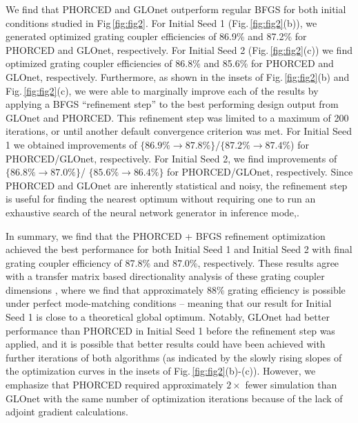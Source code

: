 \documentclass{article}
\begin{document}
We find that PHORCED and GLOnet outperform regular BFGS for both initial conditions studied in Fig\,\ref{fig:fig2}. For Initial Seed 1 (Fig.\,\ref{fig:fig2}(b)), we generated optimized grating coupler efficiencies of 86.9\% and 87.2\% for PHORCED and GLOnet, respectively. For Initial Seed 2 (Fig.\,\ref{fig:fig2}(c)) we find optimized grating coupler efficiencies of 86.8\% and 85.6\% for PHORCED and GLOnet, respectively. Furthermore, as shown in the insets of Fig.\,\ref{fig:fig2}(b) and Fig.\,\ref{fig:fig2}(c), we were able to marginally improve each of the results by applying a BFGS ``refinement step'' to the best performing design output from GLOnet and PHORCED. This refinement step was limited to a maximum of 200 iterations, or until another default convergence criterion was met. For Initial Seed 1 we obtained improvements of $\{86.9\%\rightarrow87.8\%\}$/$\{87.2\%\rightarrow 87.4\%$) for PHORCED/GLOnet, respectively. For Initial Seed 2, we find improvements of {$\{86.8\%\rightarrow87.0\%\}$/ $\{85.6\%\rightarrow 86.4\%\}$} for PHORCED/GLOnet, respectively. Since PHORCED and GLOnet are inherently statistical and noisy, the refinement step is useful for finding the nearest optimum without requiring one to run an exhaustive search of the neural network generator in inference mode,.

In summary, we find that the PHORCED + BFGS refinement optimization achieved the best performance for both Initial Seed 1 and Initial Seed 2 with final grating coupler efficiency of 87.8\% and 87.0\%, respectively. These results agree with a transfer matrix based directionality analysis of these grating coupler dimensions \cite{michaels_hierarchical_2020, michaels_gcslab_2019}, where we find that approximately 88\% grating efficiency is possible under perfect mode-matching conditions -- meaning that our result for Initial Seed 1 is close to a theoretical global optimum. Notably, GLOnet had better performance than PHORCED in Initial Seed 1 before the refinement step was applied, and it is possible that better results could have been achieved with further iterations of both algorithms (as indicated by the slowly rising slopes of the optimization curves in the insets of Fig.\,\ref{fig:fig2}(b)-(c)). However, we emphasize that PHORCED required approximately $2\times$ fewer simulation than GLOnet with the same number of optimization iterations because of the lack of adjoint gradient calculations. %
\end{document}
